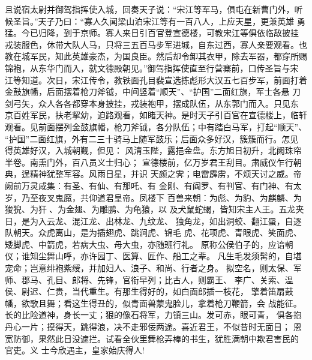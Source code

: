 且说宿太尉并御驾指挥使入城，回奏天子说：“宋江等军马，俱屯在新曹门外，听
候圣旨。”天子乃曰：“寡人久闻梁山泊宋江等有一百八人，上应天星，更兼英雄
勇猛。今已归降，到于京师。寡人来日引百官登宣德楼，可教宋江等俱依临敌披挂
戎装服色，休带大队人马，只将三五百马步军进城，自东过西，寡人亲要观看。也
教在城军民，知此英雄豪杰，为国良臣。然后却令卸其衣甲，除去军器，都穿所赐
锦袍，从东华门而入，就文德殿朝见。”御驾指挥使直至行营寨前，口传圣旨与宋
江等知道。次日，宋江传令，教铁面孔目裴宣选拣彪形大汉五七百步军，前面打着
金鼓旗幡，后面摆着枪刀斧钺，中间竖着“顺天”、“护国”二面红旗，军士各悬
刀剑弓矢，众人各各都穿本身披挂，戎装袍甲，摆成队伍，从东郭门而入。只见东
京百姓军民，扶老挈幼，迫路观看，如睹天神。是时天子引百官在宣德楼上，临轩
观看。见前面摆列金鼓旗幡，枪刀斧钺，各分队伍；中有踏白马军，打起“顺天”、
“护国”二面红旗，外有二三十骑马上随军鼓乐；后面众多好汉，簇簇而行。怎见
得英雄好汉，入城朝觐，但见：
风清玉陛，露挹金盘。东方旭日初升，北阙珠帘半卷。南熏门外，百八员义士归心；
宣德楼前，亿万岁君王刮目。肃威仪乍行朝典，逞精神犹整军容。风雨日星，并识
天颜之霁；电雷霹雳，不烦天讨之威。帝阙前万灵咸集：有圣、有仙、有那吒、有
金刚、有阎罗、有判官、有门神、有太岁，乃至夜叉鬼魔，共仰道君皇帝。凤楼下
百兽来朝：为彪、为豹、为麒麟、为狻猊、为犴、为金翅、为雕鹏、为龟猿，以
及犬鼠蛇蝎，皆知宋主人王。五龙夹日，是为入云龙、混江龙、出林龙、九纹龙、
独角龙，如出洞蛟、翻江蜃，自逐队朝天。众虎离山，是为插翅虎、跳涧虎、锦毛
虎、花项虎、青眼虎、笑面虎、矮脚虎、中箭虎，若病大虫、母大虫，亦随班行礼。
原称公侯伯子的，应谙朝仪；谁知尘舞山呼，亦许园丁、医算、匠作、船工之辈。
凡生毛发须髯的，自堪宠命；岂意绯袍紫绶，并加妇人、浪子、和尚、行者之身。
拟空名，则太保、军师、郡马、孔目、郎将、先锋，官衔早列；比古人，则霸王、
李广、关索、温侯、尉迟、仁贵，当代重生。有那生得好的，如白面郎插一枝花，
擎着笛扇鼓幡，欲歌且舞；看这生得丑的，似青面兽蒙鬼脸儿，拿着枪刀鞭箭，会
战能征。长的比险道神，身长一丈；狠的像石将军，力镇三山。发可赤，眼可青，
俱各抱丹心一片；摸得天，跳得浪，决不走邪佞两途。喜近君王，不似昔时无面目；
恩宽防御，果然此日没遮拦。试看全伙里舞枪弄棒的书生，犹胜满朝中欺君害民的
官吏。义
士今欣遇主，皇家始庆得人!

